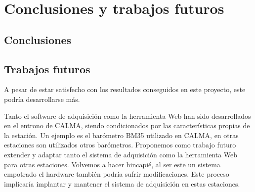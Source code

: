 \chapter{Conclusiones y trabajos futuros}
\label{cap_conclusiones}


\section{Conclusiones}

\section{Trabajos futuros}
	A pesar de estar satisfecho con los resultados conseguidos en este proyecto, este podría desarrollarse más.
	\par
	Tanto el software de adquisición como la herramienta Web han sido desarrollados en el entrono de CALMA, siendo condicionados por las
	características propias de la estación. Un ejemplo es el barómetro BM35 utilizado en CALMA, en otras estaciones son utilizados otros
	barómetros. Proponemos como trabajo futuro extender y adaptar tanto el sistema de adquisición como la herramienta Web para otras estaciones.
	Volvemos a hacer hincapié, al ser este un sistema empotrado el hardware también podría sufrir modificaciones. Este proceso implicaría
	implantar y mantener el sistema de adquisición en estas estaciones.
